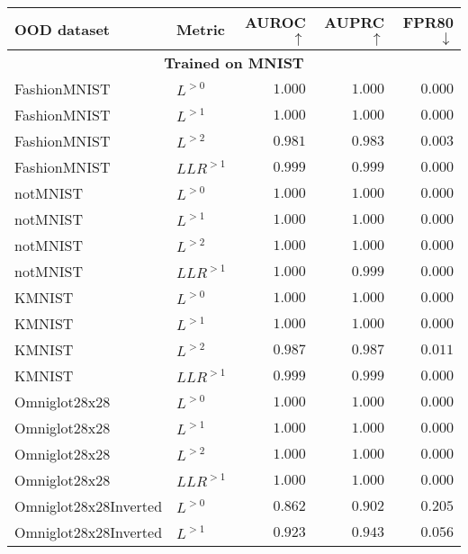 {\begin{table}[t]
    \centering
    \begin{tabular}{llrrr}
        \toprule
         OOD dataset & Metric & AUROC$\uparrow$ & AUPRC$\uparrow$ & FPR80$\downarrow$ \\
         \midrule
         \multicolumn{5}{c}{\textbf{Trained on MNIST}} \\
         \midrule
FashionMNIST                     &  $L^{>0}$  &  $1.000$  &  $1.000$  &  $0.000$ \\
FashionMNIST                     &  $L^{>1}$  &  $1.000$  &  $1.000$  &  $0.000$ \\
FashionMNIST                     &  $L^{>2}$  &  $0.981$  &  $0.983$  &  $0.003$ \\
FashionMNIST                   &  $LLR^{>1}$  &  $0.999$  &  $0.999$  &  $0.000$ \\
\midrule
notMNIST                         &  $L^{>0}$  &  $1.000$  &  $1.000$  &  $0.000$ \\
notMNIST                         &  $L^{>1}$  &  $1.000$  &  $1.000$  &  $0.000$ \\
notMNIST                         &  $L^{>2}$  &  $1.000$  &  $1.000$  &  $0.000$ \\
notMNIST                       &  $LLR^{>1}$  &  $1.000$  &  $0.999$  &  $0.000$ \\
\midrule
KMNIST                           &  $L^{>0}$  &  $1.000$  &  $1.000$  &  $0.000$ \\
KMNIST                           &  $L^{>1}$  &  $1.000$  &  $1.000$  &  $0.000$ \\
KMNIST                           &  $L^{>2}$  &  $0.987$  &  $0.987$  &  $0.011$ \\
KMNIST                         &  $LLR^{>1}$  &  $0.999$  &  $0.999$  &  $0.000$ \\
\midrule
Omniglot28x28                    &  $L^{>0}$  &  $1.000$  &  $1.000$  &  $0.000$ \\
Omniglot28x28                    &  $L^{>1}$  &  $1.000$  &  $1.000$  &  $0.000$ \\
Omniglot28x28                    &  $L^{>2}$  &  $1.000$  &  $1.000$  &  $0.000$ \\
Omniglot28x28                  &  $LLR^{>1}$  &  $1.000$  &  $1.000$  &  $0.000$ \\
\midrule
Omniglot28x28Inverted            &  $L^{>0}$  &  $0.862$  &  $0.902$  &  $0.205$ \\
Omniglot28x28Inverted            &  $L^{>1}$  &  $0.923$  &  $0.943$  &  $0.056$ \\

\end{tabular}
\end{table}}

